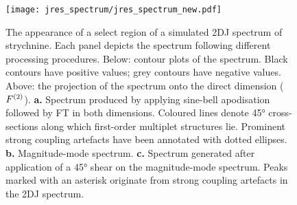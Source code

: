 \begin{figure}
{{    }
    }
    \label{fig:jres-ab}
    \vspace{20pt}
    \texttt{[image: jres\_spectrum/jres\_spectrum\_new.pdf]}%
    \caption[
        The appearence of a select region of a \acs{2DJ} spectrum of
        strychnine, following different processing procedures.
    ]
    {%
        The appearance of a select region of a simulated \acs{2DJ} spectrum of
        strychnine.
        Each panel depicts the spectrum following different processing
        procedures. Below: contour plots of the spectrum.
        Black contours have positive values; grey contours have negative
        values.
        Above: the projection of the spectrum onto the direct dimension ($F^{(2)}$).
        \textbf{a.} Spectrum produced by applying sine-bell apodisation
        followed by \ac{FT} in both dimensions.
        Coloured lines denote \ang{45} cross-sections along which first-order
        multiplet structures lie.
        Prominent strong coupling artefacts have been annotated with dotted
        ellipses.
        \textbf{b.} Magnitude-mode spectrum.
        \textbf{c.} Spectrum generated after application of a \ang{45} shear on
        the magnitude-mode spectrum. Peaks marked with an asterisk originate
        from strong coupling artefacts in the \ac{2DJ} spectrum.
   }%
    \label{fig:jres-spectrum}%
    \end{figure}

